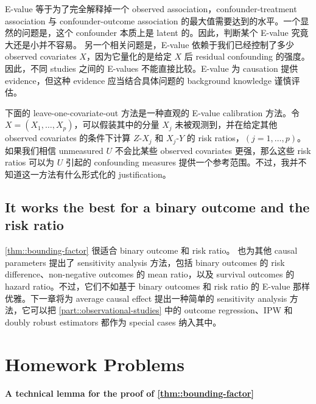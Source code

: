 E-value 等于为了完全解释掉一个 observed association，confounder-treatment association 与 confounder-outcome association 的最大值需要达到的水平。一个显然的问题是，这个 confounder 本质上是 latent 的。因此，判断某个 E-value 究竟大还是小并不容易。
另一个相关问题是，E-value 依赖于我们已经控制了多少 observed covariates $X$，因为它量化的是给定 $X$ 后 residual confounding 的强度。因此，不同 studies 之间的 E-values 不能直接比较。E-value 为 causation 提供 evidence，但这种 evidence 应当结合具体问题的 background knowledge 谨慎评估。


下面的 leave-one-covariate-out 方法是一种直观的 E-value calibration 方法。令 $X = (X_1, \ldots, X_p)$，可以假装其中的分量 $X_j$ 未被观测到，并在给定其他 observed covariates 的条件下计算 $Z$-$X_j$ 和 $X_j$-$Y$ 的 risk ratios，$(j=1, \ldots, p)$。如果我们相信 unmeasured $U$ 不会比某些 observed covariates 更强，那么这些 risk ratios 可以为 $U$ 引起的 confounding measures 提供一个参考范围。不过，我并不知道这一方法有什么形式化的 justification。



\subsection{It works the best for  a binary outcome and the risk ratio}


\cref{thm::bounding-factor} 很适合 binary outcome 和 risk ratio。\citet{ding2016sensitivity} 也为其他 causal parameters 提出了 sensitivity analysis 方法，包括 binary outcomes 的 risk difference、non-negative outcomes 的 mean ratio，以及 survival outcomes 的 hazard ratio。不过，它们不如基于 binary outcomes 和 risk ratio 的 E-value 那样优雅。下一章将为 average causal effect 提出一种简单的 sensitivity analysis 方法，它可以把 \cref{part::observational-studies} 中的 outcome regression、IPW 和 doubly robust estimators 都作为 special cases 纳入其中。





\section{Homework Problems}


\paragraph{A technical lemma for the proof of \cref{thm::bounding-factor}}
\label{hw::technical-for-evalue-increasing}

